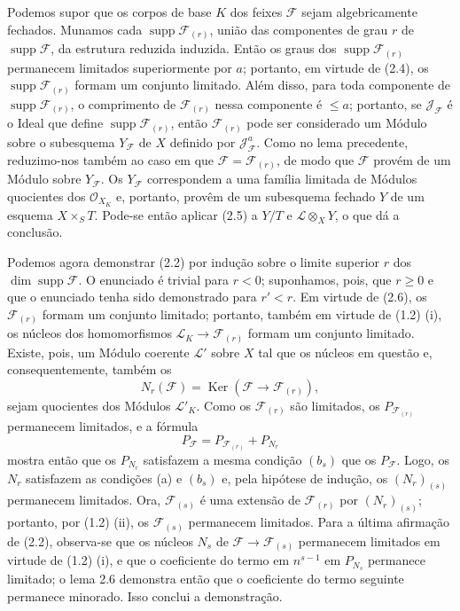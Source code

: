 Podemos supor que os corpos de base $K$ dos feixes $\mathcal F$ sejam
algebricamente fechados. Munamos cada
$\operatorname{supp}\mathcal F_{(r)}$, união das componentes de grau
$r$ de
$\operatorname{supp}\mathcal F$, da estrutura reduzida induzida. Então os graus dos
$\operatorname{supp}\mathcal F_{(r)}$ permanecem limitados superiormente por
$a$; portanto, em virtude de (2.4), os
$\operatorname{supp}\mathcal F_{(r)}$ formam um conjunto limitado. Além disso,
para toda componente de $\operatorname{supp}\mathcal F_{(r)}$, o comprimento de
$\mathcal F_{(r)}$ nessa componente é $\leq a$; portanto, se
$\mathcal J_{\mathcal F}$ é o Ideal que define
$\operatorname{supp}\mathcal F_{(r)}$, então $\mathcal F_{(r)}$
pode ser considerado um Módulo sobre o subesquema $Y_{\mathcal F}$ de $X$
definido por $\mathcal J_{\mathcal F}^{a}$. Como no lema precedente, reduzimo-nos também
ao caso em que $\mathcal F=\mathcal F_{(r)}$, de modo que $\mathcal F$
provém de um Módulo sobre $Y_{\mathcal F}$. Os $Y_{\mathcal F}$ correspondem
a uma família limitada de Módulos quocientes dos $\mathcal O_{X_K}$ e,
portanto, provêm de um subesquema fechado $Y$ de um esquema $X\times_S T$.
Pode-se então aplicar (2.5) a $Y/T$ e $\mathcal L\otimes_XY$, o que dá a
conclusão.

Podemos agora demonstrar (2.2) por indução sobre o limite superior $r$ dos
$\dim\operatorname{supp}\mathcal F$. O enunciado é trivial para $r<0$;
suponhamos, pois, que $r\geq0$ e que o enunciado tenha sido demonstrado para
$r'<r$. Em virtude de (2.6), os $\mathcal F_{(r)}$ formam um conjunto
limitado; portanto, também em virtude de (1.2) (i), os núcleos dos
homomorfismos $\mathcal L_K\longrightarrow\mathcal F_{(r)}$ formam um
conjunto limitado. Existe, pois, um Módulo coerente $\mathcal L'$ sobre $X$
tal que os núcleos em questão e, consequentemente, também os
\[
N_r(\mathcal F)=\operatorname{Ker}(\mathcal F\longrightarrow\mathcal F_{(r)}),
\]
sejam quocientes dos Módulos $\mathcal L'_K$. Como os $\mathcal F_{(r)}$ são
limitados, os $P_{\mathcal F_{(r)}}$ permanecem limitados, e a fórmula
\[
P_{\mathcal F}=P_{\mathcal F_{(r)}}+P_{N_r}
\]
mostra então que os $P_{N_r}$ satisfazem a mesma condição $(b_s)$ que os
$P_{\mathcal F}$. Logo, os $N_r$ satisfazem as condições (a) e $(b_s)$ e,
pela hipótese de indução, os $(N_r)_{(s)}$ permanecem limitados. Ora,
$\mathcal F_{(s)}$ é uma extensão de $\mathcal F_{(r)}$ por
$(N_r)_{(s)}$; portanto, por (1.2) (ii), os $\mathcal F_{(s)}$ permanecem
limitados. Para a última afirmação de (2.2), observa-se que os núcleos $N_s$ de
$\mathcal F\longrightarrow\mathcal F_{(s)}$ permanecem limitados em virtude
de (1.2) (i), e que o coeficiente do termo em $n^{s-1}$ em $P_{N_s}$ permanece
limitado; o lema 2.6 demonstra então que o coeficiente do termo seguinte
permanece minorado. Isso conclui a demonstração.

